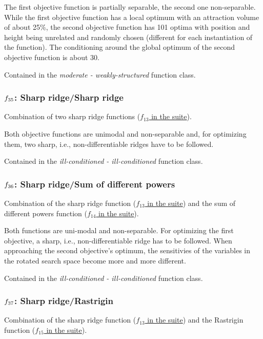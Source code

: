 \documentclass[letterpaper,12pt,english]{article}
\begin{document}
The first objective function is partially separable, the second one
non-separable. While the first objective function has a local optimum
with an attraction volume of about 25\%, the second objective function
has 101 optima with position and height being unrelated and randomly
chosen (different for each instantiation of the function). The
conditioning around the global optimum of the second objective function
is about 30.

Contained in the \emph{moderate - weakly-structured} function class.


\subsubsection{\protect\(f_{35}\protect\): Sharp ridge/Sharp ridge}
\label{index:sharp-ridge-sharp-ridge}\label{index:f35}
Combination of two sharp ridge functions (\href{http://coco.lri.fr/downloads/download15.03/bbobdocfunctions.pdf\#page=65}{\(f_{13}\) in the  suite}).

Both objective functions are unimodal and non-separable and, for
optimizing them, two sharp, i.e., non-differentiable ridges have to be
followed.

Contained in the \emph{ill-conditioned - ill-conditioned} function class.


\subsubsection{\protect\(f_{36}\protect\): Sharp ridge/Sum of different powers}
\label{index:sharp-ridge-sum-of-different-powers}\label{index:f36}
Combination of the sharp ridge function (\href{http://coco.lri.fr/downloads/download15.03/bbobdocfunctions.pdf\#page=65}{\(f_{13}\) in the  suite}) and the
sum of different powers function
(\href{http://coco.lri.fr/downloads/download15.03/bbobdocfunctions.pdf\#page=70}{\(f_{14}\) in the  suite}).

Both functions are uni-modal and non-separable.
For optimizing the first objective, a sharp, i.e., non-differentiable
ridge has to be followed.
When approaching the second objective's optimum, the sensitivies of the
variables in the rotated search space become more and more different.

Contained in the \emph{ill-conditioned - ill-conditioned} function class.


\subsubsection{\protect\(f_{37}\protect\): Sharp ridge/Rastrigin}
\label{index:sharp-ridge-rastrigin}\label{index:f37}
Combination of the sharp ridge function (\href{http://coco.lri.fr/downloads/download15.03/bbobdocfunctions.pdf\#page=65}{\(f_{13}\) in the  suite}) and the Rastrigin function
(\href{http://coco.lri.fr/downloads/download15.03/bbobdocfunctions.pdf\#page=75}{\(f_{15}\) in the  suite}).
\end{document}
